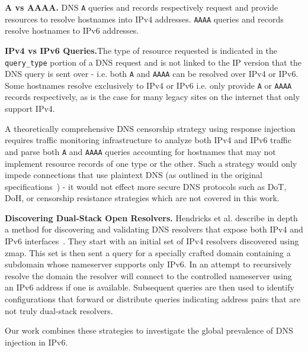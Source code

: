 \textbf{A vs AAAA.} DNS \texttt{A} queries and records respectively request and provide
resources to resolve hostnames into IPv4 addresses. \texttt{AAAA} queries and
records resolve hostnames to IPv6 addresses.

\textbf{IPv4 vs IPv6 Queries.}The type of resource requested is
indicated in the \texttt{query\_type} portion of a DNS request and is not linked
to the IP version that the DNS query is sent over - i.e. both \texttt{A} and
\texttt{AAAA} can be resolved over IPv4 or IPv6.
Some hostnames resolve exclusively to IPv4 or IPv6 i.e. only provide \texttt{A}
or \texttt{AAAA} records respectively, as is the case for many legacy sites on
the internet that only support IPv4.

A theoretically comprehensive DNS censorship strategy using response injection
requires traffic monitoring infrastructure to analyze both IPv4 and IPv6
traffic and parse both \texttt{A} and \texttt{AAAA} queries accounting for hostnames
that may not implement resource records of one type or the other. Such a strategy
would only impede connections that use plaintext DNS (as outlined in the
original specifications~\cite{RFC1035,RFC3596}) - it would not effect more secure DNS
protocols such as DoT, DoH, or censorship resistance strategies which are not
covered in this work.

\textbf{Discovering Dual-Stack Open Resolvers.}
Hendricks et al. describe in depth a method for discovering and validating DNS
resolvers that expose both IPv4 and IPv6 interfaces~\cite{hendriks2017potential}.
They start with an initial
set of IPv4 resolvers discovered using zmap. This set is then sent a query for a
specially crafted domain containing a subdomain whose nameserver supports only
IPv6. In an attempt to recursively resolve the domain the resolver will connect
to the controlled nameserver using an IPv6 address if one is available.
Subsequent queries are then used to identify configurations that forward or
distribute queries indicating address pairs that are not truly dual-stack resolvers.

Our work combines these strategies to investigate the global prevalence of DNS
injection in IPv6.